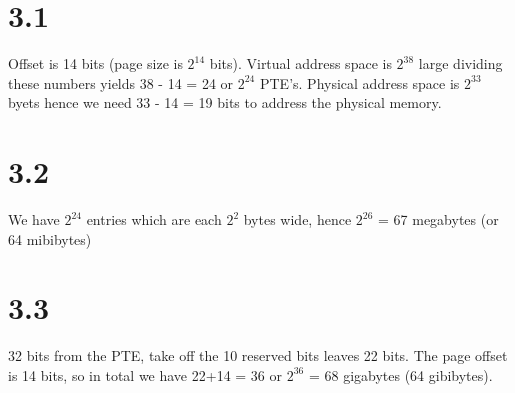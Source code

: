\documentclass[10pt,a4paper]{article}
\begin{document}
\section*{3.1}
Offset is 14 bits (page size is $2^{14}$ bits). Virtual address space is $2^{38}$ large dividing these numbers yields 38 - 14 = 24 or $2^{24}$ PTE's. Physical address space is $2^{33}$ byets hence we need 33 - 14 = 19 bits to address the physical memory.
\section*{3.2}
We have $2^{24}$ entries which are each $2^{2}$ bytes wide, hence $2^{26}$ = 67 megabytes (or 64 mibibytes)
\section*{3.3}
32 bits from the PTE, take off the 10 reserved bits leaves 22 bits. The page offset is 14 bits, so in total we have 22+14 = 36 or $2^{36}$ = 68 gigabytes (64 gibibytes).
\end{document}
